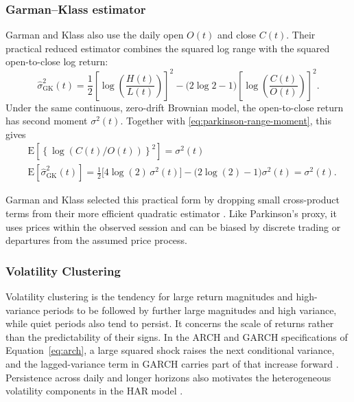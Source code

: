 \documentclass[12pt,a4paper]{article}
\numberwithin{equation}{section}
\numberwithin{table}{section}
\numberwithin{figure}{section}
\begin{document}
\subsubsection{Garman--Klass estimator}
Garman and Klass also use the daily open $O(t)$ and close $C(t)$. Their practical reduced estimator combines the squared log range with the squared open-to-close log return:
\begin{equation}\label{eq:garman-klass-variance}
\widehat\sigma^2_{\mathrm{GK}}(t)=\frac12\left[\log\!\left(\frac{H(t)}{L(t)}\right)\right]^2
-\bigl(2\log 2-1\bigr)\left[\log\!\left(\frac{C(t)}{O(t)}\right)\right]^2.
\end{equation}
Under the same continuous, zero-drift Brownian model, the open-to-close return has second moment $\sigma^2(t)$. Together with \eqref{eq:parkinson-range-moment}, this gives
\begin{equation}\label{eq:garman-klass-return}
\begin{aligned}
&\mathrm E\!\left[\left\{\log\!\left(C(t)/O(t)\right)\right\}^{2}\right]
=\sigma^2(t)\\[0.5em]
&\mathrm E\!\left[\widehat\sigma^2_{\mathrm{GK}}(t)\right]
=\tfrac12\bigl[4\log(2)\,\sigma^2(t)\bigr]
-\bigl(2\log(2)-1\bigr)\sigma^2(t)=\sigma^2(t).
\end{aligned}
\end{equation}

Garman and Klass selected this practical form by dropping small cross-product terms from their more efficient quadratic estimator \cite{garmanklass1980}. Like Parkinson's proxy, it uses prices within the observed session and can be biased by discrete trading or departures from the assumed price process. 

\subsubsection{Volatility Clustering}
Volatility clustering is the tendency for large return magnitudes and high-variance periods to be followed by further large magnitudes and high variance, while quiet periods also tend to persist. It concerns the scale of returns rather than the predictability of their signs. In the ARCH and GARCH specifications of Equation~\eqref{eq:arch}, a large squared shock raises the next conditional variance, and the lagged-variance term in GARCH carries part of that increase forward \cite{engle1982,bollerslev1986}. Persistence across daily and longer horizons also motivates the heterogeneous volatility components in the HAR model \cite{corsi2009}.
\end{document}
